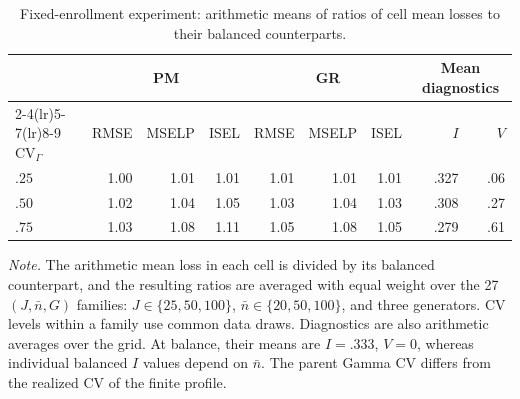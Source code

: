 \begin{table}[!ht]
\caption{Fixed-enrollment experiment: arithmetic means of ratios of cell mean losses to their balanced counterparts.}
\label{tab:F-fixedN}
\centering
\begin{tablebody}
\begin{tabular}{@{}lrrrrrrrr@{}}
\toprule
& \multicolumn{3}{c}{PM} & \multicolumn{3}{c}{GR} & \multicolumn{2}{c}{Mean diagnostics} \\
\cmidrule(lr){2-4}\cmidrule(lr){5-7}\cmidrule(lr){8-9}
$\mathrm{CV}_{\Gamma}$ & RMSE & MSELP & ISEL & RMSE & MSELP & ISEL & $I$ & $V$ \\
\midrule
$.25$ & 1.00 & 1.01 & 1.01 & 1.01 & 1.01 & 1.01 & .327 & .06 \\
\addlinespace[5pt]
$.50$ & 1.02 & 1.04 & 1.05 & 1.03 & 1.04 & 1.03 & .308 & .27 \\
\addlinespace[5pt]
$.75$ & 1.03 & 1.08 & 1.11 & 1.05 & 1.08 & 1.05 & .279 & .61 \\
\bottomrule
\end{tabular}
\end{tablebody}
\par\vspace{0.4\baselineskip}
\begin{minipage}{\linewidth}\normalsize\doublespacing\raggedright
\textit{Note.} The arithmetic mean loss in each cell is divided by its balanced counterpart, and the resulting ratios are averaged with equal weight over the 27 $(J,\bar n,G)$ families: $J\in\{25,50,100\}$, $\bar n\in\{20,50,100\}$, and three generators. CV levels within a family use common data draws. Diagnostics are also arithmetic averages over the grid. At balance, their means are $I=.333$, $V=0$, whereas individual balanced $I$ values depend on $\bar n$. The parent Gamma CV differs from the realized CV of the finite profile.
\end{minipage}
\end{table}
